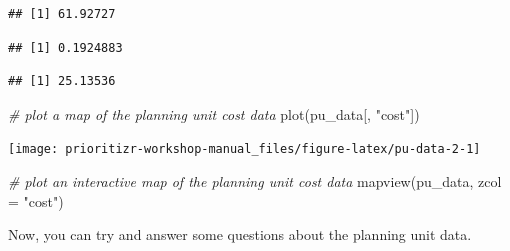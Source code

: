 \documentclass[
  12pt,
]{book}
\newenvironment{Shaded}{\begin{snugshade}}{\end{snugshade}}
\newcommand{\AttributeTok}[1]{\textcolor[rgb]{0.77,0.63,0.00}{#1}}
\newcommand{\CommentTok}[1]{\textcolor[rgb]{0.56,0.35,0.01}{\textit{#1}}}
\newcommand{\FunctionTok}[1]{\textcolor[rgb]{0.00,0.00,0.00}{#1}}
\newcommand{\NormalTok}[1]{#1}
\newcommand{\SpecialCharTok}[1]{\textcolor[rgb]{0.00,0.00,0.00}{#1}}
\newcommand{\StringTok}[1]{\textcolor[rgb]{0.31,0.60,0.02}{#1}}
\begin{document}
\begin{verbatim}
## [1] 61.92727
\end{verbatim}

\begin{Shaded}
\end{Shaded}

\begin{verbatim}
## [1] 0.1924883
\end{verbatim}

\begin{Shaded}
\end{Shaded}

\begin{verbatim}
## [1] 25.13536
\end{verbatim}

\begin{Shaded}
\begin{Highlighting}[]
\CommentTok{\# plot a map of the planning unit cost data}
\FunctionTok{plot}\NormalTok{(pu\_data[, }\StringTok{"cost"}\NormalTok{])}
\end{Highlighting}
\end{Shaded}

\begin{center}\texttt{[image: prioritizr-workshop-manual\_files/figure-latex/pu-data-2-1]} \end{center}

\begin{Shaded}
\begin{Highlighting}[]
\CommentTok{\# plot an interactive map of the planning unit cost data}
\FunctionTok{mapview}\NormalTok{(pu\_data, }\AttributeTok{zcol =} \StringTok{"cost"}\NormalTok{)}
\end{Highlighting}
\end{Shaded}

Now, you can try and answer some questions about the planning unit data.
\end{document}
